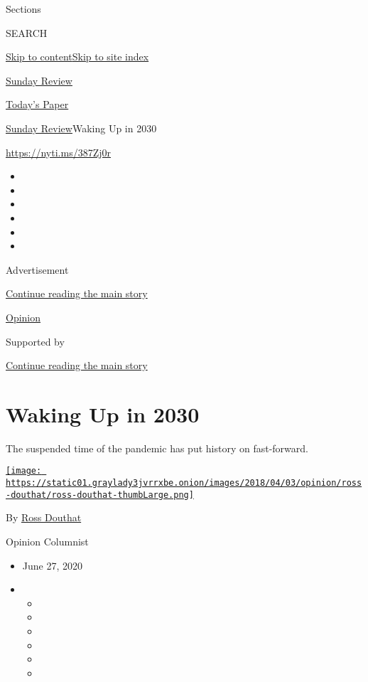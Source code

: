 Sections

SEARCH

\protect\hyperlink{site-content}{Skip to
content}\protect\hyperlink{site-index}{Skip to site index}

\href{https://www.nytimes3xbfgragh.onion/section/opinion/sunday}{Sunday
Review}

\href{https://myaccount.nytimes3xbfgragh.onion/auth/login?response_type=cookie\&client_id=vi}{}

\href{https://www.nytimes3xbfgragh.onion/section/todayspaper}{Today's
Paper}

\href{/section/opinion/sunday}{Sunday Review}\textbar{}Waking Up in 2030

\url{https://nyti.ms/387Zj0r}

\begin{itemize}
\item
\item
\item
\item
\item
\item
\end{itemize}

Advertisement

\protect\hyperlink{after-top}{Continue reading the main story}

\href{/section/opinion}{Opinion}

Supported by

\protect\hyperlink{after-sponsor}{Continue reading the main story}

\hypertarget{waking-up-in-2030}{%
\section{Waking Up in 2030}\label{waking-up-in-2030}}

The suspended time of the pandemic has put history on fast-forward.

\href{https://www.nytimes3xbfgragh.onion/by/ross-douthat}{\texttt{[image: https://static01.graylady3jvrrxbe.onion/images/2018/04/03/opinion/ross-douthat/ross-douthat-thumbLarge.png]}}

By \href{https://www.nytimes3xbfgragh.onion/by/ross-douthat}{Ross
Douthat}

Opinion Columnist

\begin{itemize}
\item
  June 27, 2020
\item
  \begin{itemize}
  \item
  \item
  \item
  \item
  \item
  \item
  \end{itemize}
\end{itemize}

